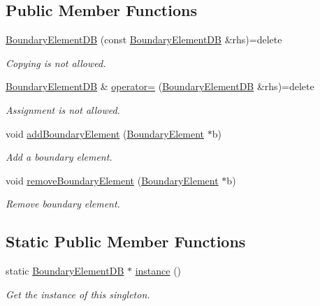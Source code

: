 \subsection*{Public Member Functions}
\begin{DoxyCompactItemize}
\item 
\hyperlink{classBoundaryElementDB_a734b7bbb4aa92a6fcbb0e13a2730542d}{Boundary\+Element\+D\+B} (const \hyperlink{classBoundaryElementDB}{Boundary\+Element\+D\+B} \&rhs)=delete
\begin{DoxyCompactList}\small\item\em Copying is not allowed. \end{DoxyCompactList}\item 
\hyperlink{classBoundaryElementDB}{Boundary\+Element\+D\+B} \& \hyperlink{classBoundaryElementDB_ad42f6c382956dee33a609da771fdce88}{operator=} (\hyperlink{classBoundaryElementDB}{Boundary\+Element\+D\+B} \&rhs)=delete
\begin{DoxyCompactList}\small\item\em Assignment is not allowed. \end{DoxyCompactList}\item 
void \hyperlink{classBoundaryElementDB_a87b287f3028a92ee56edba04d0293b6f}{add\+Boundary\+Element} (\hyperlink{classBoundaryElement}{Boundary\+Element} $\ast$b)
\begin{DoxyCompactList}\small\item\em Add a boundary element. \end{DoxyCompactList}\item 
void \hyperlink{classBoundaryElementDB_a0392d6b0a27d7dfc57d39194165c3543}{remove\+Boundary\+Element} (\hyperlink{classBoundaryElement}{Boundary\+Element} $\ast$b)
\begin{DoxyCompactList}\small\item\em Remove boundary element. \end{DoxyCompactList}\end{DoxyCompactItemize}
\subsection*{Static Public Member Functions}
\begin{DoxyCompactItemize}
\item 
static \hyperlink{classBoundaryElementDB}{Boundary\+Element\+D\+B} $\ast$ \hyperlink{classBoundaryElementDB_a576c2f5e552686c2f40e70e206693f2a}{instance} ()
\begin{DoxyCompactList}\small\item\em Get the instance of this singleton. \end{DoxyCompactList}\end{DoxyCompactItemize}
